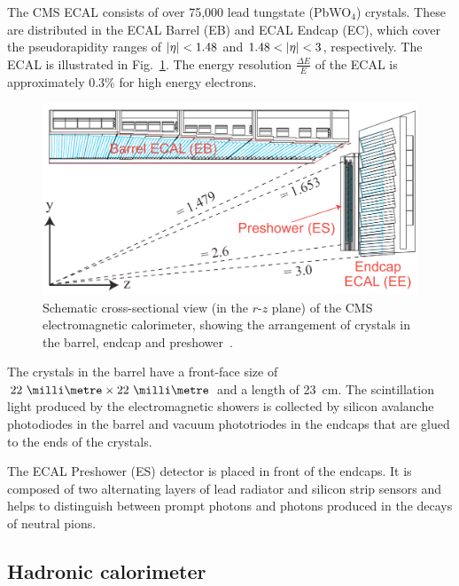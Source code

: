 
The CMS ECAL consists of over 75,000 lead tungstate (PbWO$_4$) crystals. These 
are distributed in the ECAL Barrel (EB) and ECAL Endcap (EC), which cover the 
pseudorapidity ranges of $|\eta|<1.48$ and $1.48 < |\eta| < 3$, 
respectively. The ECAL is illustrated in Fig.~\ref{fig:ecal}. 
The energy resolution $\frac{\Delta E}{E}$ of the ECAL is approximately 0.3\% 
for high energy electrons.

\begin{figure}
	\begin{center}
		\includegraphics[width=0.7\linewidth]{figs/detector/ecal}
	\end{center}
	\caption{Schematic cross-sectional view (in the $r$-$z$ plane) of the CMS 
		electromagnetic calorimeter, showing the arrangement of crystals in the 
		barrel, 
		endcap and preshower~\cite{cms}.}
	\label{fig:ecal}
\end{figure}

The crystals in the barrel have a front-face size of 
$22~\milli\metre \times 22~\milli\metre$ and a length of 23~cm. The 
scintillation 
light produced by the electromagnetic showers is collected by silicon 
avalanche photodiodes in the barrel and vacuum phototriodes in the endcaps that 
are glued to the ends of the crystals.

The ECAL Preshower (ES) detector is placed in front of the endcaps. It is 
composed of two alternating layers of lead radiator and silicon strip sensors 
and helps to distinguish between prompt photons and photons produced in the 
decays of neutral pions.%

\subsection{Hadronic calorimeter}


